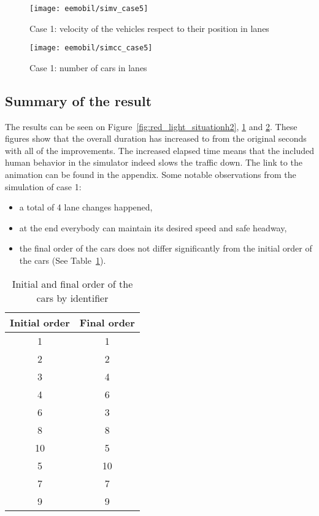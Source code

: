			\begin{figure}
				\centering
				\texttt{[image: eemobil/simv\_case5]}
				\caption{Case 1: velocity of the vehicles respect to their position in lanes}
				\label{fig:red_light_situationv2}
			\end{figure}
			\begin{figure}
				\centering
				\texttt{[image: eemobil/simcc\_case5]}
				\caption{Case 1: number of cars in lanes}
				\label{fig:red_light_situationcc2}
			\end{figure}
			\subsection*{Summary of the result}
			The results can be seen on Figure~\ref{fig:red_light_situationh2}, \ref{fig:red_light_situationv2} and \ref{fig:red_light_situationcc2}. These figures show that the overall duration has increased to from the original seconds with all of the improvements. The increased elapsed time means that the included human behavior in the simulator indeed slows the traffic down. The link to the animation can be found in the appendix.
			Some notable observations from the simulation of case 1:
			
			\begin{itemize}
				\item a total of 4 lane changes happened,
				\item at the end everybody can maintain its desired speed and safe headway,
				\item the final order of the cars does not differ significantly from the initial order of the cars (See Table~\ref{tab:car_order_case_1}).
			\end{itemize}
			\begin{table}[ht]
				\begin{center}
					\begin{tabular}{ |c|c| }
						\hline
						Initial order & Final order \\
						\hline
						1 & 1\\
						2 & 2\\
						3 & 4\\
						4 & 6\\
						6 & 3\\
						8 & 8\\
						10 & 5\\
						5 & 10\\
						7 & 7\\
						9 & 9\\
						\hline
					\end{tabular}
				\end{center}
				\caption{Initial and final order of the cars by identifier}
				\label{tab:car_order_case_1}
			\end{table}
